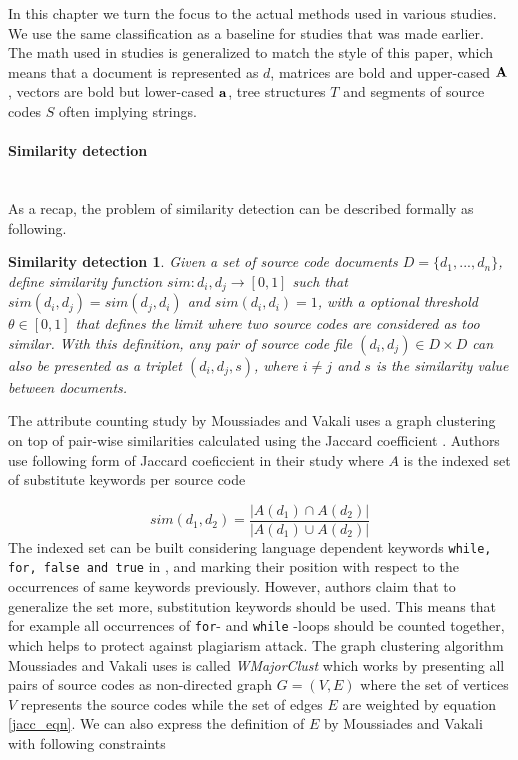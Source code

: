 In this chapter we turn the focus to the actual methods used in various studies. We use the same 
classification as a baseline for studies that was made earlier. The math used in studies is generalized to match the style of this paper, which means that a document is represented as $d$, matrices are bold and upper-cased $\mathbf{A}$, vectors are bold but lower-cased $\mathbf{a}$, tree structures $T$ and segments of source codes $S$ often implying strings. 

\paragraph{Similarity detection}\mbox{}\\
As a recap, the problem of similarity detection can be described formally as following.

\newtheorem*{smd}{Similarity detection}

\begin{smd}
Given a set of source code documents $D = \{d_1,...,d_n\}$, define similarity function $sim: d_i, d_j \rightarrow [0, 1]$ such that $sim(d_i, d_j) = sim(d_j, d_i)$ and $sim(d_i, d_i) = 1$, with a optional threshold $\theta \in [0, 1]$ that defines the limit where two source codes are considered as too similar. With this definition, any pair of source code file $(d_i, d_j) \in D \times D$ can also be presented as a triplet $(d_i, d_j, s)$, where $i \neq j$ and $s$ is the similarity value between documents. 
\end{smd}

The attribute counting study by Moussiades and Vakali uses a graph clustering on top of pair-wise similarities calculated using the Jaccard coefficient \cite{PACASCD2005}. Authors use following form of Jaccard coeficcient in their study where $A$ is the indexed set of substitute keywords per source code 

\begin{equation}\label{jacc_eqn}
    sim(d_1, d_2) = \dfrac{|A(d_1) \cap A(d_2)|}{|A(d_1) \cup A(d_2)|}
\end{equation}
\noindent
The indexed set can be built considering language dependent keywords \eg \texttt{while, for, false and true} in \cpp, and marking their position with respect to the occurrences of same keywords previously. However, authors claim that to generalize the set more, substitution keywords should be used. This means that for example all occurrences of \texttt{for}- and \texttt{while} -loops should be counted together, which helps to protect against plagiarism attack. The graph clustering algorithm Moussiades and Vakali uses is called \emph{WMajorClust} which works by presenting all pairs of source codes as non-directed graph $G = (V, E)$ where the set of vertices $V$ represents the source codes while the set of edges $E$ are weighted by equation \ref{jacc_eqn}. We can also express the definition of $E$ by Moussiades and Vakali with following constraints

